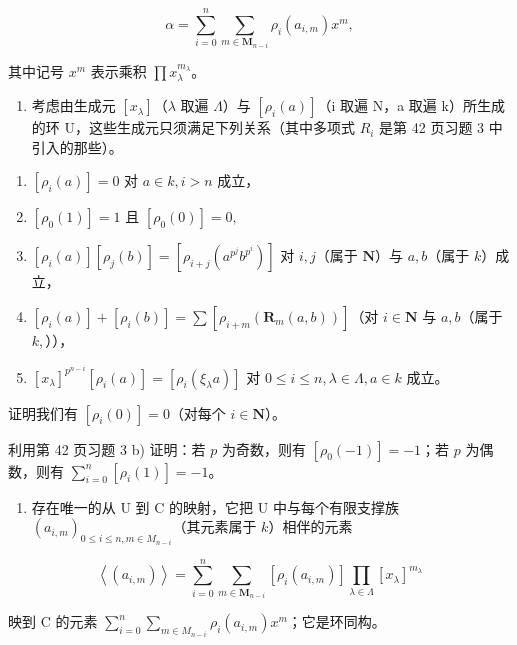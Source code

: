 \[
\alpha = \sum_ {i = 0} ^ {n} \sum_ {m \in \mathbf {M} _ {n - i}} \rho_ {i} (a _ {i, m}) x ^ {m},
\]

其中记号 \(x^{m}\) 表示乘积 \(\prod x_{\lambda}^{m_{\lambda}}\)。

\begin{enumerate}
\def\labelenumi{\alph{enumi})}
\setcounter{enumi}{1}
\tightlist
\item
  考虑由生成元 \([x_{\lambda}]\)（\(\lambda\) 取遍 \(\Lambda\)）与 \([\rho_{i}(a)]\)（i 取遍 N，a 取遍 k）所生成的环 U，这些生成元只须满足下列关系（其中多项式 \(R_{i}\) 是第 42 页习题 3 中引入的那些）。
\end{enumerate}

\begin{enumerate}
\def\labelenumi{(\roman{enumi})}
\item
  \([\rho_i(a)] = 0\) 对 \(a \in k, i > n\) 成立，
\item
  \(\left[\rho_0(1)\right] = 1\) 且 \(\left[\rho_0(0)\right] = 0,\)
\item
  \([\rho_i(a)][\rho_j(b)] = [\rho_{i + j}(a^{p^j}b^{p^i})]\) 对 \(i,j\)（属于 \(\mathbf{N}\)）与 \(a,b\)（属于 \(k\)）成立，
\item
  \([\rho_i(a)] + [\rho_i(b)] = \sum [\rho_{i+m}(\mathbf{R}_m(a,b))]\)（对 \(i\in \mathbf{N}\) 与 \(a,b\)（属于 \(k,\)）），
\item
  \([x_{\lambda}]^{p^{n - i}}[\rho_i(a)] = [\rho_i(\xi_{\lambda}a)]\) 对 \(0 \leqslant i \leqslant n, \lambda \in \Lambda, a \in k\) 成立。
\end{enumerate}

证明我们有 \([\rho_i(0)] = 0\)（对每个 \(i \in \mathbf{N}\)）。

利用第 42 页习题 3 b) 证明：若 \(p\) 为奇数，则有 \([\rho_0(-1)] = -1\)；若 \(p\) 为偶数，则有 \(\sum_{i=0}^{n} [\rho_i(1)] = -1\)。

\begin{enumerate}
\def\labelenumi{\alph{enumi})}
\setcounter{enumi}{2}
\tightlist
\item
  存在唯一的从 U 到 C 的映射，它把 U 中与每个有限支撑族 \((a_{i,m})_{0\leqslant i\leqslant n,m\in M_{n - i}}\)（其元素属于 \(k\)）相伴的元素
\end{enumerate}

\[
\left\langle \left(a _ {i, m}\right) \right\rangle = \sum_ {i = 0} ^ {n} \sum_ {m \in \mathbf {M} _ {n - i}} \left[ \rho_ {i} (a _ {i, m}) \right] \prod_ {\lambda \in \Lambda} [ x _ {\lambda} ] ^ {m _ {\lambda}}
\]

映到 C 的元素 \(\sum_{i=0}^{n}\sum_{m\in M_{n-i}}\rho_i(a_{i,m})x^m\)；它是环同构。

